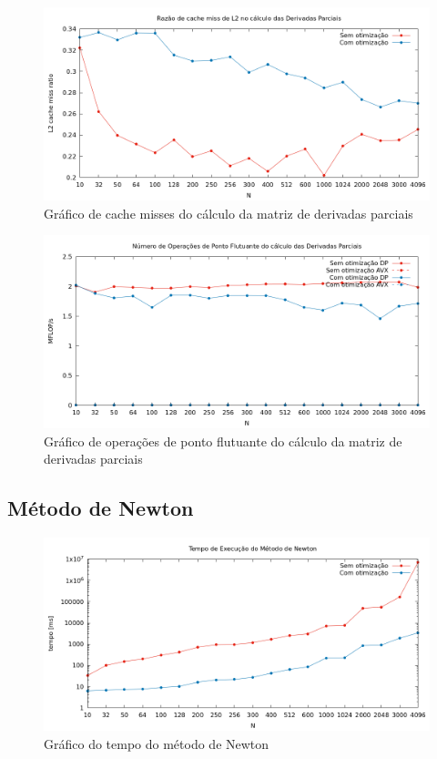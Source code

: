\documentclass{article}
\begin{document}
\begin{figure}[htp]
    \centering
    \includegraphics[width=12cm]{l2cache_derivadas.png}
    \caption{Gráfico de cache misses do cálculo da matriz de derivadas parciais}
    \label{fig:l2_derivadas}
\end{figure}

\begin{figure}[htp]
    \centering
    \includegraphics[width=12cm]{flops_dp_derivadas.png}
    \caption{Gráfico de operações de ponto flutuante do cálculo da matriz de derivadas parciais}
    \label{fig:flops_derivadas}
\end{figure}

\newpage
\subsection{Método de Newton}

\begin{figure}[htp]
    \centering
    \includegraphics[width=12cm]{tempo_newton.png}
    \caption{Gráfico do tempo do método de Newton}
    \label{fig:tempo_newton}
\end{figure}
\end{document}
